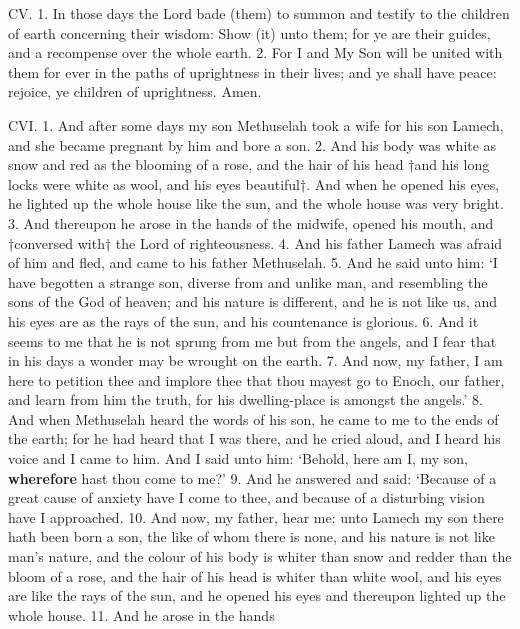 
CV. 1. In those days the Lord bade (them) to
summon and testify to the children of earth concerning
their wisdom: Show (it) unto them; for ye are
their guides, and a recompense over the whole earth.
2. For I and My Son will be united with them for
ever in the paths of uprightness in their lives; and
ye shall have peace: rejoice, ye children of uprightness.
Amen.


CVI. 1. And after some days my son Methuselah
took a wife for his son Lamech, and she became
pregnant by him and bore a son. 2. And his body
was white as snow and red as the blooming of a rose,
and the hair of his head †and his long locks were
white as wool, and his eyes beautiful†. And when he
opened his eyes, he lighted up the whole house like
the sun, and the whole house was very bright. 3.
And thereupon he arose in the hands of the midwife,
opened his mouth, and †conversed with† the Lord of
righteousness. 4. And his father Lamech was afraid
of him and fled, and came to his father Methuselah.
5. And he said unto him: ‘I have begotten a strange
son, diverse from and unlike man, and resembling
the sons of the God of heaven; and his nature is
different, and he is not like us, and his eyes are as the
rays of the sun, and his countenance is glorious. 6.
And it seems to me that he is not sprung from me but
from the angels, and I fear that in his days a wonder
may be wrought on the earth. 7. And now, my
father, I am here to petition thee and implore thee
that thou mayest go to Enoch, our father, and learn
from him the truth, for his dwelling-place is amongst
the angels.’ 8. And when Methuselah heard the
words of his son, he came to me to the ends of the
earth; for he had heard that I was there, and he cried
aloud, and I heard his voice and I came to him. And
I said unto him: ‘Behold, here am I, my son,
\textbf{wherefore} hast thou come to me?’ 9. And he
answered and said: ‘Because of a great cause of
anxiety have I come to thee, and because of a disturbing
vision have I approached. 10. And now,
my father, hear me: unto Lamech my son there hath
been born a son, the like of whom there is none, and
his nature is not like man’s nature, and the colour
of his body is whiter than snow and redder than the
bloom of a rose, and the hair of his head is whiter
than white wool, and his eyes are like the rays of the
sun, and he opened his eyes and thereupon lighted
up the whole house. 11. And he arose in the hands
